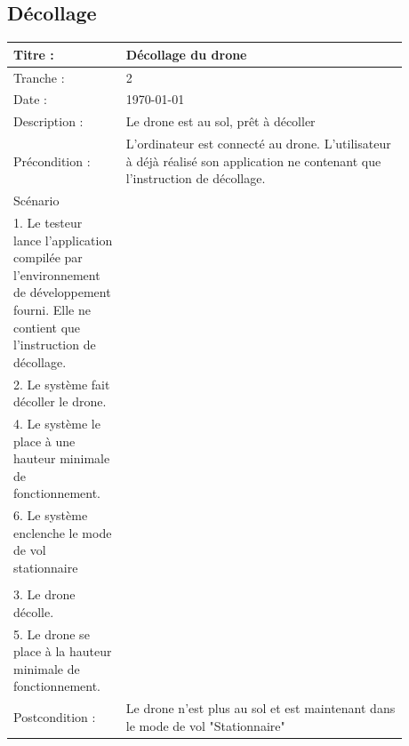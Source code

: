 \documentclass[12pt, openany]{report}
\begin{document}
\subsection*{Décollage}
\begin{tabular}{|p{0.25\linewidth} | p{0.21\linewidth} | p{0.21\linewidth} | p{0.21\linewidth} |} 
\hline
\rowcolor[RGB]{200, 200, 200}Titre :& \multicolumn{3}{p{0.70\linewidth}|}{Décollage du drone } \\
\hline
Tranche :& \multicolumn{3}{p{0.70\linewidth}|}{2} \\
\hline
\hline
Date :& \multicolumn{3}{p{0.70\linewidth}|}{\today }\\
\hline
Description :& \multicolumn{3}{p{0.70\linewidth}|}{Le drone est au sol, prêt à décoller} \\
\hline
Précondition :& \multicolumn{3}{p{0.70\linewidth}|}{L'ordinateur est connecté au drone. L'utilisateur à déjà réalisé son application ne contenant que l'instruction de décollage.} \\
\hline
Scénario & {
	\begin{minipage}[t]{\linewidth}
	Utilisateur : \\
	1. Le testeur lance l'application compilée par l'environnement de développement fourni. Elle ne contient que l'instruction de décollage.
	 \end{minipage}
	} & {
	\begin{minipage}[t]{\linewidth}
	Application :\\
	2. Le système fait décoller le drone. \\
	4. Le système le place à une hauteur minimale de fonctionnement. \\
	6. Le système enclenche le mode de vol stationnaire\\
	 \end{minipage}
	} & {
	\begin{minipage}[t]{\linewidth}
	Drone :\\
	3. Le drone décolle.\\
	5. Le drone se place à la hauteur minimale de fonctionnement.
	 \end{minipage}
	} \\

\hline
Postcondition : & \multicolumn{3}{p{0.70\linewidth}|}{Le drone n'est plus au sol et est maintenant dans le mode de vol "Stationnaire"}\\
\hline
\end{tabular}
\end{document}
